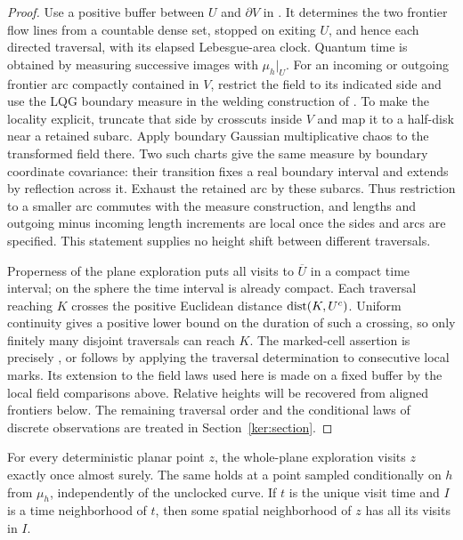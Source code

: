 \begin{proof}
Use a positive buffer between $U$ and $\partial V$ in
\cite[Lemma 2.4]{GwynneMillerSheffieldHarmonic}.  It determines the two
frontier flow lines from a countable dense set, stopped on exiting $U$,
and hence each directed traversal, with its elapsed Lebesgue-area clock.
Quantum time is obtained by measuring successive images with $\mu_h|_U$.
For an incoming or outgoing frontier arc compactly contained in $V$,
restrict the field to its indicated side and use the LQG boundary measure
in the welding construction of \cite{DMSMating}.  To make the locality
explicit, truncate that side by crosscuts inside $V$ and map it to a
half-disk near a retained subarc.  Apply boundary Gaussian multiplicative
chaos to the transformed field there.  Two such charts give the same
measure by boundary coordinate covariance: their transition fixes a
real boundary interval and extends by reflection across it.  Exhaust
the retained arc by these subarcs.  Thus restriction to a smaller arc
commutes with the measure construction, and lengths and outgoing minus
incoming length increments are local once the sides and arcs are
specified.  This statement supplies no height shift between different
traversals.

Properness of the plane exploration puts all visits to $\overline U$ in
a compact time interval; on the sphere the time interval is already
compact.  Each traversal reaching $K$ crosses the positive Euclidean
distance $\operatorname{dist}(K,U^c)$.  Uniform continuity gives a positive lower bound
on the duration of such a crossing, so only finitely many disjoint
traversals can reach $K$.  The marked-cell assertion is precisely
\cite[Lemma 3.7]{ContrerasHipGwynneCurvature}, or follows by applying the
traversal determination to consecutive local marks.  Its extension to
the field laws used here is made on a fixed buffer by the local field
comparisons above.  Relative heights will be recovered from aligned
frontiers below.  The remaining traversal order and the conditional
laws of discrete observations are treated in Section~\ref{ker:section}.
\end{proof}

\begin{lemma}
\label{enc:single-visit}
For every deterministic planar point $z$, the whole-plane exploration
visits $z$ exactly once almost surely.  The same holds at a point sampled
conditionally on $h$ from $\mu_h$, independently of the unclocked curve.  If $t$ is the unique
visit time and $I$ is a time neighborhood of $t$, then some spatial
neighborhood of $z$ has all its visits in $I$.
\end{lemma}

